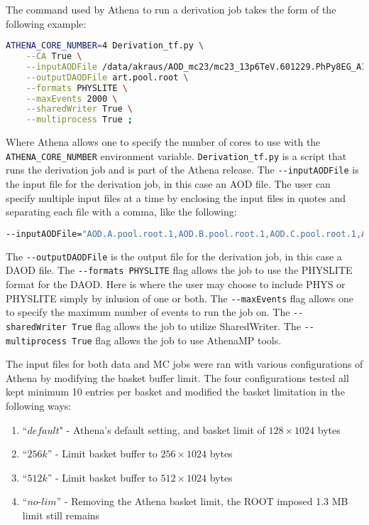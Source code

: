 The command used by Athena to run a derivation job takes the form of the following example: 
\begin{lstlisting}[language=bash]
    ATHENA_CORE_NUMBER=4 Derivation_tf.py \
    --CA True \
    --inputAODFile /data/akraus/AOD_mc23/mc23_13p6TeV.601229.PhPy8EG_A14_ttbar_hdamp258p75_SingleLep.merge.AOD.e8514_e8528_s4162_s4114_r14622_r14663/AOD.33799166._001224.pool.root.1 \
    --outputDAODFile art.pool.root \
    --formats PHYSLITE \
    --maxEvents 2000 \
    --sharedWriter True \
    --multiprocess True ;  
\end{lstlisting}
Where Athena allows one to specify the number of cores to use with the \verb|ATHENA_CORE_NUMBER| environment variable.
\verb|Derivation_tf.py| is a script that runs the derivation job and is part of the Athena release.
The \verb|--inputAODFile| is the input file for the derivation job, in this case an AOD file.
The user can specify multiple input files at a time by enclosing the input files in quotes and separating each file with a comma, like the following:
\begin{lstlisting}[language=bash]
    --inputAODFile="AOD.A.pool.root.1,AOD.B.pool.root.1,AOD.C.pool.root.1,AOD.D.pool.root.1"
\end{lstlisting}
The \verb|--outputDAODFile| is the output file for the derivation job, in this case a DAOD file.
The \verb|--formats PHYSLITE| flag allows the job to use the PHYSLITE format for the DAOD.
Here is where the user may choose to include PHYS or PHYSLITE simply by inlusion of one or both.
The \verb|--maxEvents| flag allows one to specify the maximum number of events to run the job on.
The \verb|--sharedWriter True| flag allows the job to utilize SharedWriter. 
The \verb|--multiprocess True| flag allows the job to use AthenaMP tools.




The input files for both data and MC jobs were ran with various configurations of Athena by modifying the basket buffer limit. 
The four configurations tested all kept minimum 10 entries per basket and modified the basket limitation in the following ways: 

\begin{enumerate}
    \item ``$\textit{default}$" - Athena's default setting, and basket limit of $128\times1024$ bytes
    \item ``$\textit{256k}$'' - Limit basket buffer to $256\times1024$ bytes
    \item ``$\textit{512k}$'' - Limit basket buffer to $512\times1024$ bytes
    \item ``$\textit{no-lim}$'' - Removing the Athena basket limit, the ROOT imposed 1.3 MB limit still remains
\end{enumerate}

